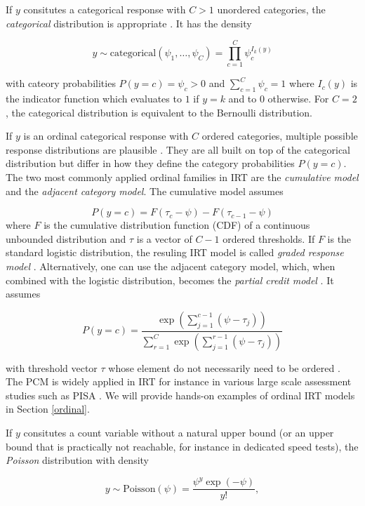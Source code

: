 \documentclass[jss]{jss}
\begin{document}
If \(y\) consitutes a categorical response with \(C > 1\) unordered
categories, the \emph{categorical} distribution is appropriate
\citep{agresti2010}. It has the density

\[
y \sim \text{categorical}(\psi_1, \ldots, \psi_C) = \prod_{c = 1}^C \psi_c^{I_k(y)}
\]

with cateory probabilities \(P(y = c) = \psi_c > 0\) and
\(\sum_{c=1}^C \psi_c = 1\) where \(I_c(y)\) is the indicator function
which evaluates to \(1\) if \(y = k\) and to \(0\) otherwise. For
\(C = 2\), the categorical distribution is equivalent to the Bernoulli
distribution.

If \(y\) is an ordinal categorical response with \(C\) ordered
categories, multiple possible response distributions are plausible
\citep{agresti2010, buerkner2019}. They are all built on top of the
categorical distribution but differ in how they define the category
probabilities \(P(y = c)\). The two most commonly applied ordinal
families in IRT are the \emph{cumulative model} and the \emph{adjacent
category model}. The cumulative model assumes

\[
P(y = c) = F(\tau_c - \psi) - F(\tau_{c-1} - \psi)
\] where \(F\) is the cumulative distribution function (CDF) of a
continuous unbounded distribution and \(\tau\) is a vector of \(C-1\)
ordered thresholds. If \(F\) is the standard logistic distribution, the
resuling IRT model is called \emph{graded response model}
\citep[GRM;][]{samejima1997}. Alternatively, one can use the adjacent
category model, which, when combined with the logistic distribution,
becomes the \emph{partial credit model} \citep[PCM;][]{rasch1961}. It
assumes

\[
P(y = c) = \frac{\exp \left(\sum_{j=1}^{c-1} (\psi -\tau_{j}) \right)}
  {\sum_{r=1}^{C} \exp\left(\sum_{j=1}^{r-1} (\psi -\tau_{j}) \right)}
\]

with threshold vector \(\tau\) whose element do not necessarily need to
be ordered \citep{adams2012}. The PCM is widely applied in IRT for
instance in various large scale assessment studies such as PISA
\citep{oecd2017}. We will provide hands-on examples of ordinal IRT
models in Section \ref{ordinal}.

If \(y\) consitutes a count variable without a natural upper bound (or
an upper bound that is practically not reachable, for instance in
dedicated speed tests), the \emph{Poisson} distribution with density

\[
y \sim \text{Poisson}(\psi) = \frac{\psi^y \exp(-\psi)}{y!},
\]
\end{document}
